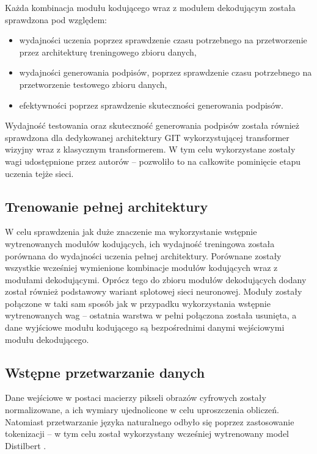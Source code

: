 Każda kombinacja modułu kodującego wraz z modułem dekodującym została sprawdzona pod względem:
\begin{itemize}
    \item wydajności uczenia poprzez sprawdzenie czasu potrzebnego na przetworzenie przez architekturę treningowego zbioru danych,
    \item wydajności generowania podpisów, poprzez sprawdzenie czasu potrzebnego na przetworzenie testowego zbioru danych,
    \item efektywności poprzez sprawdzenie skuteczności generowania podpisów.
\end{itemize}
Wydajność testowania oraz skuteczność generowania podpisów została również sprawdzona dla dedykowanej architektury GIT \cite{wang2022git} wykorzystującej transformer wizyjny wraz z klasycznym transformerem. W tym celu wykorzystane zostały wagi udostępnione przez autorów -- pozwoliło to na całkowite pominięcie etapu uczenia tejże sieci.
\subsection{Trenowanie pełnej architektury}
W celu sprawdzenia jak duże znaczenie ma wykorzystanie wstępnie wytrenowanych modułów kodujących, ich wydajność treningowa została porównana do wydajności uczenia pełnej architektury. Porównane zostały wszystkie wcześniej wymienione kombinacje modułów kodujących wraz z modułami dekodującymi. Oprócz tego do zbioru modułów dekodujących dodany został również podstawowy wariant splotowej sieci neuronowej. Moduły zostały połączone w taki sam sposób jak w przypadku wykorzystania wstępnie wytrenowanych wag -- ostatnia warstwa w pełni połączona została usunięta, a dane wyjściowe modułu kodującego są bezpośrednimi danymi wejściowymi modułu dekodującego.
\subsection{Wstępne przetwarzanie danych}
Dane wejściowe w postaci macierzy pikseli obrazów cyfrowych zostały normalizowane, a ich wymiary ujednolicone w celu uproszczenia obliczeń. Natomiast przetwarzanie języka naturalnego odbyło się poprzez zastosowanie tokenizacji -- w tym celu został wykorzystany wcześniej wytrenowany model Distilbert \cite{distilbert}.
